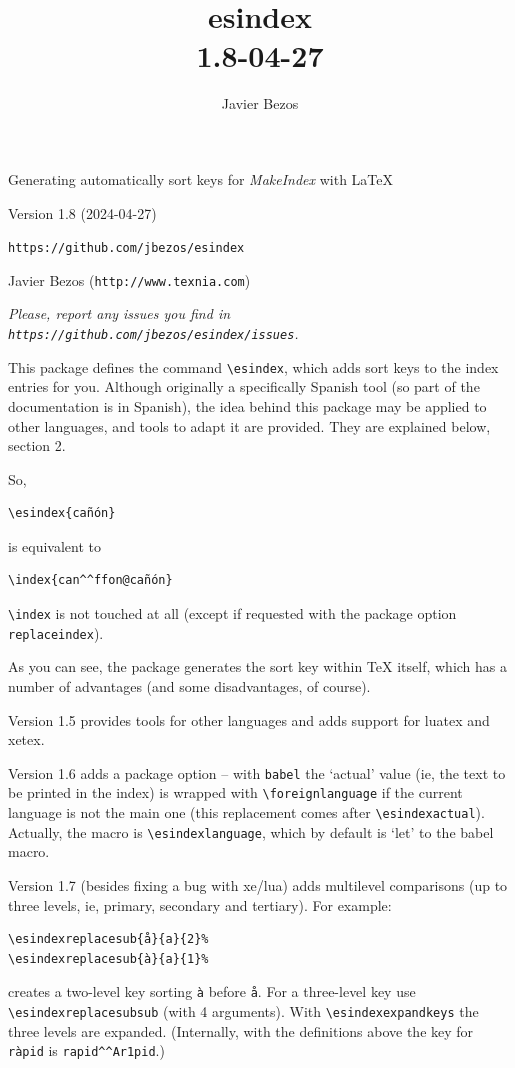 \documentclass[a4paper]{ltxguide}
\title{\textsf{esindex}\\\large 1.8\quad 2024-04-27}
\author{Javier Bezos}
\begin{document}
\vspace*{1cm}
{\fontsize{48}{48}\selectfont \color{notes}{esindex}\par}
{\LARGE Generating automatically sort keys for \textit{MakeIndex}
with \LaTeX\par}
\vspace*{1ex}
Version 1.8 (2024-04-27)\par
\texttt{https://github.com/jbezos/esindex}\par
Javier Bezos (\texttt{http://www.texnia.com})

\vspace*{6ex}

{\small\itshape Please, report any issues you find in
  \texttt{https://github.com/jbezos/esindex/issues}.\par}

This package defines the command \verb|\esindex|, which adds sort keys
to the index entries for you. Although originally a specifically Spanish
tool (so part of the documentation is in Spanish), the idea behind this
package may be applied to other languages, and tools to adapt it are
provided. They are explained below, section 2.

So,
\begin{verbatim}
\esindex{cañón}
\end{verbatim}
is equivalent to
\begin{verbatim}
\index{can^^ffon@cañón}
\end{verbatim}

\verb|\index| is not touched at all (except if requested with the package
option \verb|replaceindex|).

As you can see, the package generates the sort key within \TeX{}
itself, which has a number of advantages (and some disadvantages, of
course).

Version 1.5 provides tools for other languages and adds support for
\textsf{luatex} and \textsf{xetex}.

Version 1.6 adds a package option -- with \verb|babel| the `actual' value
(ie, the text to be printed in the index) is wrapped with
\verb|\foreignlanguage| if the current language is not the main one
(this replacement comes after \verb|\esindexactual|). Actually, the
macro is \verb|\esindexlanguage|, which by default is `let' to the
\textsf{babel} macro.

Version 1.7 (besides fixing a bug with xe/lua) adds multilevel
comparisons (up to three levels, ie, primary, secondary and tertiary).
For example:
\begin{verbatim}
\esindexreplacesub{å}{a}{2}%
\esindexreplacesub{à}{a}{1}%
\end{verbatim}
creates a two-level key sorting \verb|à| before \verb|å|. For a
three-level key use \verb|\esindexreplacesubsub| (with 4 arguments). With
\verb|\esindexexpandkeys| the three levels are expanded. (Internally,
with the definitions above the key for \verb|ràpid| is
\verb|rapid^^Ar1pid|.)
\end{document}
